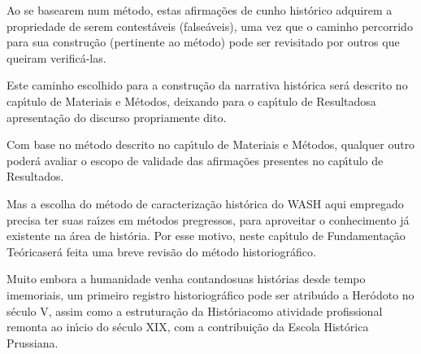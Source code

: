 \documentclass[
12pt,		%
openright,	%
twoside,  %
a4paper,			%
chapter=TITLE,		%
english,			%
french,				%
spanish,			%
brazil				%
]{USPSC-classe/USPSC_RedarTex}
\begin{document}
Ao se basearem num m\'etodo, estas afirma\c{c}\~oes de cunho hist\'orico adquirem a propriedade de serem contest\'aveis (false\'aveis), uma vez que o caminho percorrido para sua constru\c{c}\~ao (pertinente ao m\'etodo) pode ser revisitado por outros que queiram verific\'a-las.










Este caminho escolhido para a constru\c{c}\~ao da narrativa hist\'orica ser\'a descrito no cap\'{\i}tulo de \textquotedbl Materiais e M\'etodos\textquotedbl , deixando para o cap\'{\i}tulo de \textquotedbl Resultados\textquotedbl  a apresenta\c{c}\~ao do discurso propriamente dito.










Com base no m\'etodo descrito no cap\'{\i}tulo de \textquotedbl Materiais e M\'etodos\textquotedbl , qualquer outro poder\'a avaliar o escopo de validade das afirma\c{c}\~oes presentes no cap\'{\i}tulo de \textquotedbl Resultados\textquotedbl .










Mas a escolha do m\'etodo de caracteriza\c{c}\~ao hist\'orica do WASH aqui empregado precisa ter suas ra\'{\i}zes em m\'etodos pregressos, para aproveitar o conhecimento j\'a existente na \'area de hist\'oria. Por esse motivo, neste cap\'{\i}tulo de \textquotedbl Fundamenta\c{c}\~ao Te\'orica\textquotedbl  ser\'a feita uma breve revis\~ao do m\'etodo historiogr\'afico.










Muito embora a humanidade venha \textquotedbl contando\textquotedbl  suas hist\'orias desde tempo imemoriais, um primeiro registro historiogr\'afico pode ser atribu\'{\i}do a Her\'odoto no s\'eculo V, assim como a estrutura\c{c}\~ao da \textquotedbl Hist\'oria\textquotedbl  como atividade profissional remonta ao in\'{\i}cio do s\'eculo XIX, com a contribui\c{c}\~ao da Escola Hist\'orica Prussiana.
\end{document}
